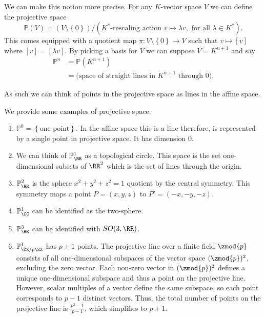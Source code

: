 \documentclass[12pt, a4paper]{article}
\newcommand{\PP}{\mathbb P}
\begin{document}
\begin{mdremark}
    We can make this notion more precise. For any \(K\)-vector space \(V\) we can define the projective space 
    \[\PP(V)= \left( V\setminus \left\{ 0 \right\} \right) / (\text{\(K^*\)-rescaling action } v \mapsto \lambda v, \text{ for all \(\lambda \in K^*\)}).\]
    This comes equipped with a quotient map \(\pi:V\setminus \left\{ 0 \right\} \to V\) such that \(v \mapsto [v]\) where \([v]=[\lambda v]\). By picking a basis for \(V\) we can suppose \(V= K^{n+1}\) and say 
    \[\begin{aligned}
        \PP^n &= \PP(K^{n+1}) \\
        &=\text{(space of straight lines in \(K^{n+1}\) through \(0\))}.
    \end{aligned}\]
\end{mdremark}

\begin{mdnote}
    As such we can think of points in the projective space as lines in the affine space.
\end{mdnote}

\begin{mdexample}
    We provide some examples of projective space.
    \begin{enumerate}
        \item \(\mathbb{P}^0 = \left\{ \text{one point} \right\}\). In the affine space this is a line therefore, is represented by a single point in projective space. It has dimension \(0\).
        \item We can think of \(\PP^1_{\RR}\) as a topological circle. This space is the set one-dimensional subsets of \(\RR^2\) which is the set of lines through the origin. 
        \item \(\PP^2_{\RR}\) is the sphere \(x^2+y^2+z^2=1\) quotient by the central symmetry. This symmetry maps a point \(P=(x,y,z)\) to \(P'=(-x,-y,-z)\).
        \item \(\PP^1_{\CC}\) can be identified as the two-sphere.
        \item \(\PP^3_{\RR}\) can be identified with \(SO(3,\RR)\).
    \item \(\PP^1_{\ZZ/p\ZZ}\) has \(p+1\) points. The projective line over a finite field $\zmod{p}$ consists of all one-dimensional subspaces of the vector space $(\zmod{p})^2$, excluding the zero vector. Each non-zero vector in $(\zmod{p})^2$ defines a unique one-dimensional subspace and thus a point on the projective line. However, scalar multiples of a vector define the same subspace, so each point corresponds to $p-1$ distinct vectors. Thus, the total number of points on the projective line is $\frac{p^2 - 1}{p - 1}$, which simplifies to $p+1$. 
    \end{enumerate}
\end{mdexample}
\end{document}
